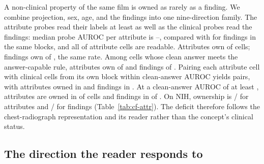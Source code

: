\documentclass{article}
\begin{document}
A non-clinical property of the same film is owned as rarely as a finding. We combine projection, sex, age, and the findings into one nine-direction family. The attribute probes read their labels at least as well as the clinical probes read the findings: median probe AUROC per attribute is \cfAttrAurocMin{}--\cfAttrAurocMax{}, compared with \cfAttrClinAuroc{} for findings in the same blocks, and all \cfAttrReadable{} of \cfAttrChestAttrN{} attribute cells are readable. Attributes own \cfAttrAllAttrOwned{} of \cfAttrAllAttrN{} cells; findings own \cfAttrAllClinOwned{} of \cfAttrAllClinN{}, the same rate. Among cells whose clean answer meets the answer-capable rule, attributes own \cfAttrCapAttrOwned{} of \cfAttrCapAttrN{} and findings \cfAttrCapClinOwned{} of \cfAttrCapClinN{}. Pairing each attribute cell with clinical cells from its own block within \cfAttrPairWindow{} clean-answer AUROC yields \cfAttrPairAttrN{} pairs, with attributes owned in \cfAttrPairAttrOwned{} and findings in \cfAttrPairClinOwned{}. At a clean-answer AUROC of at least \cfStratTopEdge{}, attributes are owned in \cfStratAttrTopOwned{} of \cfStratAttrTopN{} cells and findings in \cfStratFindTopOwned{} of \cfStratFindTopN{}. On NIH, ownership is \cfAttrNihAttrOwned{}/\cfAttrNihAttrN{} for attributes and \cfAttrNihClinOwned{}/\cfAttrNihClinN{} for findings (Table~\ref{tab:cf-attr}). The deficit therefore follows the chest-radiograph representation and its reader rather than the concept's clinical status.

\subsection{The direction the reader responds to}
\label{sec:ansdir}
\end{document}
